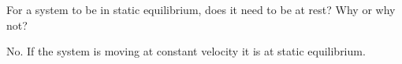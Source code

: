 For a system to be in static equilibrium, does it need to be at rest? Why or why not?

\begin{solution}
    No. If the system is moving at constant velocity it is at static equilibrium.
\end{solution}